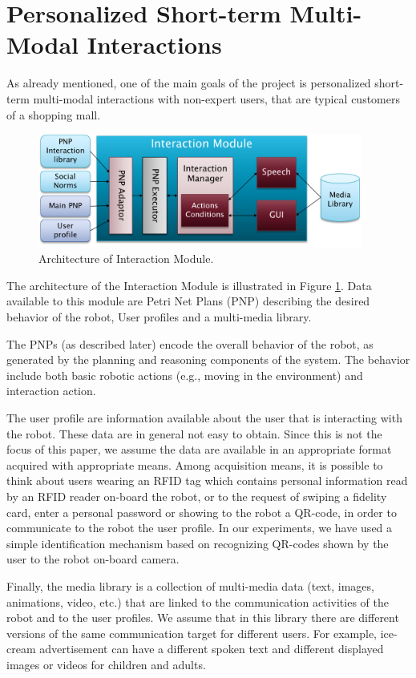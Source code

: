 \section{Personalized Short-term Multi-Modal Interactions}
\label{sec:pers}

As already mentioned, 
one of the main goals of the \coaches project is personalized short-term multi-modal interactions with non-expert users, that are typical customers of a shopping mall.

\begin{figure}
\centering
\includegraphics[width=0.95\textwidth]{fig/WP3.png}
\caption{Architecture of Interaction Module.}
\label{fig:WP3}
\end{figure}

The architecture of the Interaction Module is illustrated in Figure \ref{fig:WP3}. Data available to this module are Petri Net Plans (PNP) describing the desired behavior of the robot, User profiles and a multi-media library.

The PNPs (as described later) encode the overall behavior of the robot, as generated by the planning and reasoning components of the system. The behavior include both basic robotic actions (e.g., moving in the environment) and interaction action.

The user profile are information available about the user that is interacting with the robot. These data are in general not easy to obtain. Since this is not the focus of this paper, we assume the data are available in an appropriate format acquired with appropriate means.
Among acquisition means, it is possible to think about users wearing an RFID tag which contains personal information read by an RFID reader on-board the robot, or to the request of swiping a fidelity card, enter a personal password or showing to the robot a QR-code, in order to communicate to the robot the user profile.
In our experiments, we have used a simple identification mechanism based on recognizing QR-codes shown by the user to the robot on-board camera.

Finally, the media library is a collection of multi-media data (text, images, animations, video, etc.) that are linked to the communication activities of the robot and to the user profiles. We assume that in this library there are different versions of the same communication target for different users. For example, ice-cream advertisement can have a different spoken text and different displayed images or videos for children and adults.


